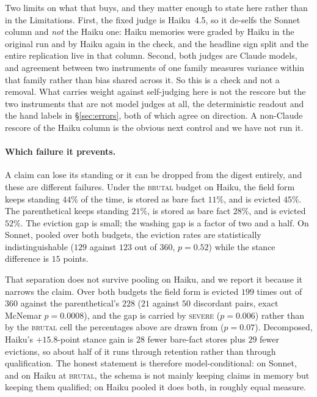 \documentclass[11pt]{article}
\begin{document}
Two limits on what that buys, and they matter enough to state here rather than in the
Limitations. First, the fixed judge is Haiku~4.5, so it de-selfs the Sonnet column and
\emph{not} the Haiku one: Haiku memories were graded by Haiku in the original run and by
Haiku again in the check, and the headline sign split and the entire replication live in
that column. Second, both judges are Claude models, and agreement between two instruments
of one family measures variance within that family rather than bias shared across it. So
this is a check and not a removal. What carries weight against self-judging here is not the
rescore but the two instruments that are not model judges at all, the deterministic readout
and the hand labels in \S\ref{sec:errors}, both of which agree on direction. A non-Claude
rescore of the Haiku column is the obvious next control and we have not run it.

\paragraph{Which failure it prevents.} A claim can lose its standing or it can be
dropped from the digest entirely, and these are different failures. Under the
\textsc{brutal} budget on Haiku, the field form keeps standing $44\%$ of the time, is
stored as bare fact $11\%$, and is evicted $45\%$. The parenthetical keeps standing
$21\%$, is stored as bare fact $28\%$, and is evicted $52\%$. The eviction gap is small;
the washing gap is a factor of two and a half. On Sonnet, pooled over both budgets, the eviction rates are
statistically indistinguishable ($129$ against $123$ out of $360$, $p=0.52$) while the
stance difference is $15$ points.

That separation does not survive pooling on Haiku, and we report it because it narrows the
claim. Over both budgets the field form is evicted $199$ times out of $360$ against the
parenthetical's $228$ ($21$ against $50$ discordant pairs, exact McNemar $p=0.0008$), and
the gap is carried by \textsc{severe} ($p=0.006$) rather than by the \textsc{brutal} cell
the percentages above are drawn from ($p=0.07$). Decomposed, Haiku's $+15.8$-point stance
gain is $28$ fewer bare-fact stores plus $29$ fewer evictions, so about half of it runs
through retention rather than through qualification. The honest statement is therefore
model-conditional: on Sonnet, and on Haiku at \textsc{brutal}, the schema is not mainly
keeping claims in memory but keeping them qualified; on Haiku pooled it does both, in
roughly equal measure.
\end{document}
